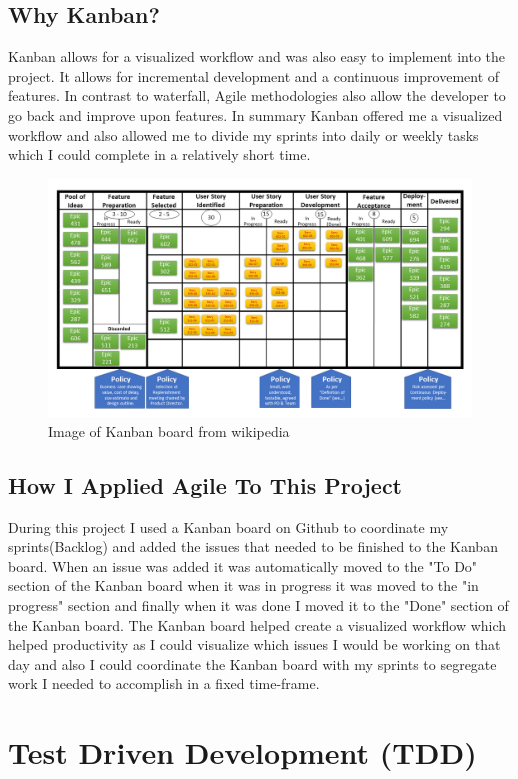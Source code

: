 \subsection{Why Kanban?}
Kanban \cite{Kanban} allows for a visualized workflow and was also easy to implement into the project. It allows for incremental development and a continuous improvement of features.  In contrast to waterfall, Agile methodologies also allow the developer to go back and improve upon features.  In summary Kanban offered me a visualized workflow and also allowed me to divide my sprints into daily or weekly tasks which I could complete in a relatively short time.
\begin{figure}
\includegraphics[width=3\linewidth]{img/kanban.png}
\caption{Image of Kanban board from wikipedia}
\label{fig:wrapfig}
\end{figure}
\subsection{How I Applied Agile To This Project}
During this project I used a Kanban board on Github \cite{KanbanBoard} to coordinate
my sprints(Backlog) and added the issues that needed to be finished to the Kanban board.   When an issue was added it was automatically moved to the "To Do" section of the Kanban board when it was in progress it was moved to the "in progress" section and finally when it was done I moved it to the "Done" section of the Kanban board.  The Kanban board helped create a visualized workflow which helped productivity as I could visualize which issues I would be working on that day and also I could coordinate
the Kanban board with my sprints to segregate work I needed to accomplish in a fixed
time-frame.
\section{Test Driven Development (TDD)}
